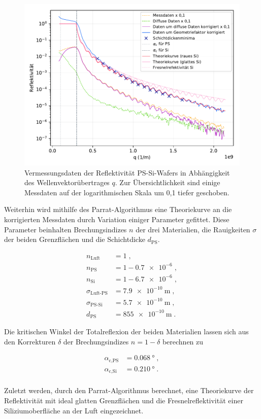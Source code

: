 \begin{figure}[H]
    \centering
    \includegraphics[scale=0.7]{content/plot4.pdf}
    \vspace{-10pt}
    \caption{Vermessungsdaten der Reflektivität PS-Si-Wafers in Abhängigkeit des Wellenvektorübertrages $q$.
            Zur Übersichtlichkeit sind einige Messdaten auf der logarithmischen Skala um 0,1 tiefer geschoben.}
    \label{fig:plot4}
\end{figure}

Weiterhin wird mithilfe des Parrat-Algorithmus eine Theoriekurve an die 
korrigierten Messdaten durch Variation einiger Parameter gefittet.
Diese Parameter beinhalten Brechungsindizes $n$ der drei Materialien, 
die Rauigkeiten $\sigma$ der beiden Grenzflächen und die Schichtdicke $d_\text{PS}$.

\vspace{-30pt}
\begin{align*}
    n_\text{Luft} &= 1 \; ,\\
    n_\text{PS} &= 1 - \num{0.7e-6} \; ,\\
    n_\text{Si} &= 1 - \num{6.7e-6} \; ,\\
    \sigma_\text{Luft-PS} &= \SI{7.9e-10}{\meter} \; ,\\
    \sigma_\text{PS-Si} &= \SI{5.7e-10}{\meter} \; ,\\
    d_\text{PS} &= \SI{855e-10}{\meter} \; .
\end{align*}

Die kritischen Winkel der Totalreflexion der beiden Materialien
lassen sich aus den Korrekturen $\delta$ der Brechungsindizes 
$n = 1 - \delta$ berechnen zu

\vspace{-20pt}
\begin{align*}
    \alpha_\text{c,PS} &= \SI{0.068}{\degree} \; ,\\
    \alpha_\text{c,Si} &= \SI{0.210}{\degree} \; .\\
\end{align*}

\vspace{-20pt}
Zuletzt werden, durch den Parrat-Algorithmus berechnet, eine Theoriekurve der Reflektivität mit
ideal glatten Grenzflächen und die Fresnelreflektivität einer Siliziumoberfläche an der Luft eingezeichnet.


